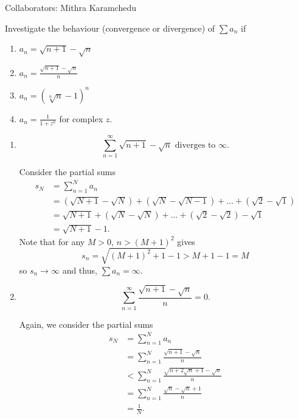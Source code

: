 \documentclass[12 pt, letterpaper]{hmcpset}
\begin{document}
Collaborators: Mithra Karamchedu

\begin{problem}
	Investigate the behaviour (convergence or divergence) of $\sum a_{n}$ if
	\begin{enumerate}
		\item $a_{n} = \sqrt{n + 1} - \sqrt{n}$
		\item $a_{n} = \frac{\sqrt{n + 1} - \sqrt{n}}{n}$ 
		\item $a_{n} = (\sqrt[n]{n} - 1)^{n}$
		\item $a_{n} = \frac{1}{1 + z^{n}}$ for complex $z$.
	\end{enumerate}
\end{problem}

\begin{solution}
	\begin{enumerate}
		\item
			\[
				\boxed{
					\sum_{n = 1}^{\infty} \sqrt{n + 1} - \sqrt{n} \text{ diverges to } \infty.
				}
			\]

			Consider the partial sums
			\[
				\begin{split}
					s_{N} & = \sum_{n = 1}^{N} a_{n} \\
					      & = (\sqrt{N + 1} - \sqrt{N}) + (\sqrt{N} - \sqrt{N - 1}) + \dots + (\sqrt{2} - \sqrt{1}) \\
					      & = \sqrt{N + 1} + (\sqrt{N} - \sqrt{N}) + \dots + (\sqrt{2} - \sqrt{2}) - \sqrt{1} \\
					      & = \sqrt{N + 1} - 1.
				\end{split}
			\]
			Note that for any $M > 0$, $n > (M + 1)^{2}$ gives
			\[
				s_{n} = \sqrt{(M + 1)^{2} + 1} - 1 > M + 1 - 1 = M
			\]
			so $s_{n} \to \infty$ and thus, $\sum a_{n} = \infty$.
		\item
			\[
				\boxed{
					\sum_{n = 1}^{\infty} \frac{\sqrt{n + 1} - \sqrt{n}}{n} = 0.
				}
			\]

			Again, we consider the partial sums
			\[
				\begin{split}
					s_{N} & = \sum_{n = 1}^{N} a_{n} \\
					      & = \sum_{n = 1}^{N} \frac{\sqrt{n + 1} - \sqrt{n}}{n} \\
					      & < \sum_{n = 1}^{N} \frac{\sqrt{n + 2 \sqrt{n} + 1} - \sqrt{n}}{n} \\
					      & = \sum_{n = 1}^{N} \frac{\sqrt{n} - \sqrt{n} + 1}{n} \\
					      & = \frac{1}{N}.
				\end{split}
			\]


\end{enumerate}
\end{solution}
\end{document}
